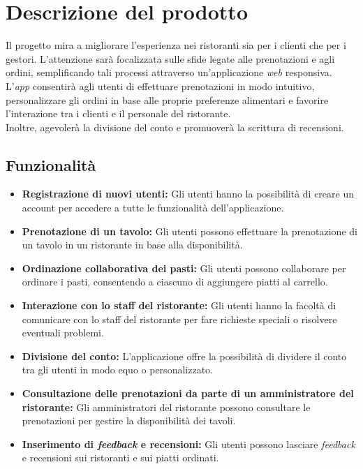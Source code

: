 \section{Descrizione del prodotto}
Il progetto mira a migliorare l'esperienza nei ristoranti sia per i clienti che per i gestori.
L'attenzione sarà focalizzata sulle sfide legate alle prenotazioni e agli ordini, semplificando tali
processi attraverso un'applicazione \textit{web} responsiva.
L'\textit{app} consentirà agli utenti di effettuare prenotazioni in modo intuitivo, personalizzare
gli ordini in base alle proprie preferenze alimentari e favorire l'interazione tra i clienti e
il personale del ristorante. \\
Inoltre, agevolerà la divisione del conto e promuoverà la scrittura di recensioni.


\subsection{Funzionalità}

\begin{itemize}
	\item \textbf{Registrazione di nuovi utenti:} Gli utenti hanno la possibilità di creare un account per accedere a tutte le funzionalità dell'applicazione.
	\item \textbf{Prenotazione di un tavolo:} Gli utenti possono effettuare la prenotazione di un tavolo in un ristorante in base alla disponibilità.
	\item \textbf{Ordinazione collaborativa dei pasti:} Gli utenti possono collaborare per ordinare i pasti, consentendo a ciascuno di aggiungere piatti al carrello.
	\item \textbf{Interazione con lo staff del ristorante:} Gli utenti hanno la facoltà di comunicare con lo staff del ristorante per fare richieste speciali o risolvere eventuali problemi.
	\item \textbf{Divisione del conto:} L'applicazione offre la possibilità di dividere il conto tra gli utenti in modo equo o personalizzato.
	\item \textbf{Consultazione delle prenotazioni da parte di un amministratore del ristorante:} Gli amministratori del ristorante possono consultare le prenotazioni per gestire la disponibilità dei tavoli.
	\item \textbf{Inserimento di \textit{feedback} e recensioni:} Gli utenti possono lasciare \textit{feedback} e recensioni sui ristoranti e sui piatti ordinati.
\end{itemize}


